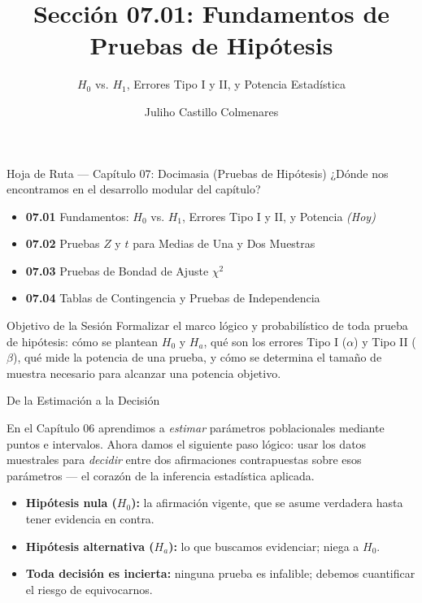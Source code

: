 \documentclass[10pt, aspectratio=169]{beamer}
\title[Fundamentos de Docimasia]{Sección 07.01: Fundamentos de Pruebas de Hipótesis}
\subtitle{$H_0$ vs. $H_1$, Errores Tipo I y II, y Potencia Estadística}
\author[J. Castillo Colmenares]{Juliho Castillo Colmenares}
\institute{Tecnológico de Monterrey}
\date{\vspace{-1.2cm}}
\begin{document}
\begin{frame}[plain]
  \vspace{-0.8cm}
  \titlepage
\end{frame}

\begin{frame}{Hoja de Ruta --- Capítulo 07: Docimasia (Pruebas de Hipótesis)}
  \footnotesize
  ¿Dónde nos encontramos en el desarrollo modular del capítulo? \pause
  \begin{itemize}\itemsep=0.08em
    \item \textbf{07.01} Fundamentos: $H_0$ vs. $H_1$, Errores Tipo I y II, y Potencia \emph{(Hoy)} \pause
    \item \textbf{07.02} Pruebas $Z$ y $t$ para Medias de Una y Dos Muestras \pause
    \item \textbf{07.03} Pruebas de Bondad de Ajuste $\chi^2$ \pause
    \item \textbf{07.04} Tablas de Contingencia y Pruebas de Independencia
  \end{itemize}
  \vspace{-0.05cm}
  \begin{block}{Objetivo de la Sesión}
    Formalizar el marco lógico y probabilístico de toda prueba de hipótesis: cómo se plantean $H_0$ y $H_a$, qué son los errores Tipo I ($\alpha$) y Tipo II ($\beta$), qué mide la potencia de una prueba, y cómo se determina el tamaño de muestra necesario para alcanzar una potencia objetivo.
  \end{block}
\end{frame}

\begin{frame}{De la Estimación a la Decisión}
  \footnotesize
  \begin{motivacion}
    En el Capítulo 06 aprendimos a \emph{estimar} parámetros poblacionales mediante puntos e intervalos. Ahora damos el siguiente paso lógico: usar los datos muestrales para \emph{decidir} entre dos afirmaciones contrapuestas sobre esos parámetros --- el corazón de la inferencia estadística aplicada.
  \end{motivacion}

  \vspace{0.15cm}
  \pause
  \begin{itemize}\itemsep=0.1cm
    \item \textbf{Hipótesis nula ($H_0$):} la afirmación vigente, que se asume verdadera hasta tener evidencia en contra. \pause
    \item \textbf{Hipótesis alternativa ($H_a$):} lo que buscamos evidenciar; niega a $H_0$. \pause
    \item \textbf{Toda decisión es incierta:} ninguna prueba es infalible; debemos cuantificar el riesgo de equivocarnos.
  \end{itemize}
\end{frame}
\end{document}
